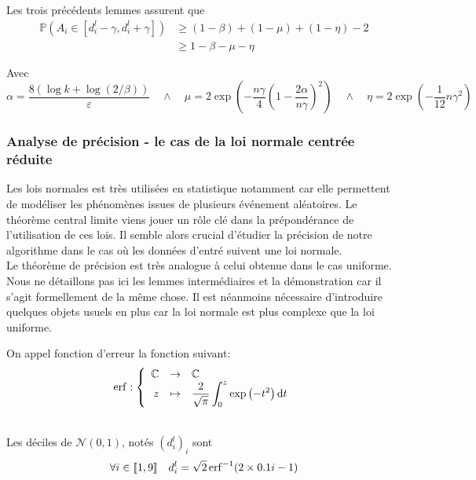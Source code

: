 Les trois précédents lemmes assurent que 
\begin{align*}
    \mathbb P\left( A_i \in [d_i^l-\gamma, d_i^l + \gamma] \right) & \geq (1 - \beta) + (1 - \mu) + (1 - \eta) - 2\\
    & \geq 1 - \beta - \mu - \eta
\end{align*}

Avec 
\[
    \alpha = \dfrac{8\left( \log k + \log(2/\beta) \right)}{\varepsilon}  \quad \wedge \quad \mu = 2\exp\left( - \dfrac{n\gamma}{4}\left(1 - \dfrac{2\alpha}{n\gamma}\right)^2\right) \quad \wedge \quad \eta  = 2\exp\left( -\dfrac{1}{12}n\gamma^2 \right)
\]

\subsubsection{Analyse de précision - le cas de la loi normale centrée réduite}

Les lois normales est très utilisées en statistique notamment car elle permettent de modéliser les phénomènes issues de plusieurs événement aléatoires. Le théorème central limite viens jouer un rôle clé dans la prépondérance de l'utilisation de ces lois. Il semble alors crucial d'étudier la précision de notre algorithme dans le cas où les données d'entré suivent une loi normale.\\

Le théorème de précision est très analogue à celui obtenue dans le cas uniforme. Nous ne détaillons pas ici les lemmes intermédiaires et la démonstration car il s'agit formellement de la même chose. Il est néanmoins nécessaire d'introduire quelques objets usuels en plus car la loi normale est plus complexe que la loi uniforme.\\


On appel fonction d'erreur la fonction suivant:
\[
        \erf: \left\{ 
        \begin{array}[]{rcl}
            \C &\to& \C\\
            z &\mapsto& \dfrac{2}{\sqrt \pi} \displaystyle\int_0^z\exp\left( -t^2 \right)\dt t
        \end{array}
        \right.
\]

\label{val_deciles_n01}\\
Les déciles de \(\mathcal N(0,1)\), notés \((d^l_i)_i\) sont 
\[
    \forall i \in \inte 1 9 \quad d^l_i = \sqrt{2} \erf^{-1}(2\times 0.1i - 1)
\]

